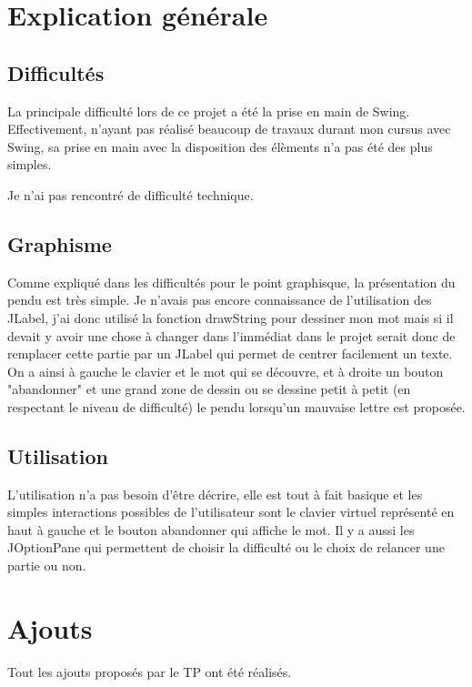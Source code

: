 \documentclass[a4paper]{article}
\date{19 Janvier 2017}
\begin{document}
\entete

\section{Explication générale}



\subsection{Difficultés}

La principale difficulté lors de ce projet a été la prise en main de Swing. Effectivement, n'ayant pas réalisé beaucoup de travaux durant mon cursus avec Swing, sa prise en main avec la disposition des élèments n'a pas été des plus simples.

Je n'ai pas rencontré de difficulté technique.

\subsection{Graphisme}

Comme expliqué dans les difficultés pour le point graphisque, la présentation du pendu est très simple. Je n'avais pas encore connaissance de l'utilisation des JLabel, j'ai donc utilisé la fonction drawString pour dessiner mon mot mais si il devait y avoir une chose à changer dans l'immédiat dans le projet serait donc de remplacer cette partie par un JLabel qui permet de centrer facilement un texte. On a ainsi à gauche le clavier et le mot qui se découvre, et à droite un bouton "abandonner" et une grand zone de dessin ou se dessine petit à petit (en respectant le niveau de difficulté) le pendu lorsqu'un mauvaise lettre est proposée.


\subsection{Utilisation}

L'utilisation n'a pas besoin d'être décrire, elle est tout à fait basique et les simples interactions possibles de l'utilisateur sont le clavier virtuel représenté en haut à gauche et le bouton abandonner qui affiche le mot. Il y a aussi les JOptionPane qui permettent de choisir la difficulté ou le choix de relancer une partie ou non.

\section{Ajouts}

Tout les ajouts proposés par le TP ont été réalisés.
\end{document}
